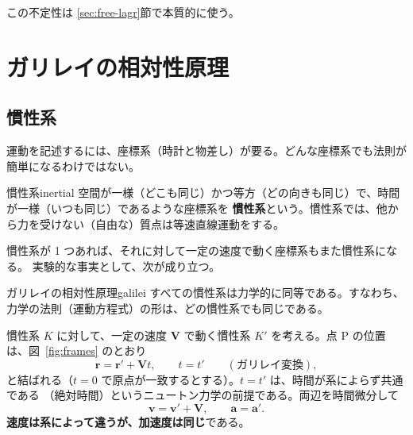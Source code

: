 この不定性は \ref{sec:free-lagr}節で本質的に使う。

\section{ガリレイの相対性原理}\label{sec:galilei}

\subsection{慣性系}

運動を記述するには、座標系（時計と物差し）が要る。どんな座標系でも法則が簡単になるわけではない。

\begin{defn}{慣性系}{inertial}
空間が一様（どこも同じ）かつ等方（どの向きも同じ）で、時間が一様（いつも同じ）であるような座標系を
\textbf{慣性系}という。慣性系では、他から力を受けない（自由な）質点は等速直線運動をする。
\end{defn}

慣性系が 1 つあれば、それに対して一定の速度で動く座標系もまた慣性系になる。
実験的な事実として、次が成り立つ。

\begin{principle}{ガリレイの相対性原理}{galilei}
すべての慣性系は力学的に同等である。すなわち、力学の法則（運動方程式）の形は、どの慣性系でも同じである。
\end{principle}

慣性系 $K$ に対して、一定の速度 $\bm V$ で動く慣性系 $K'$ を考える。点 P の位置は、図~\ref{fig:frames} のとおり
\begin{equation}
  \bm r=\bm r'+\bm V t,\qquad t=t' \qquad(\text{ガリレイ変換}),
  \label{eq:galilei}
\end{equation}
と結ばれる（$t=0$ で原点が一致するとする）。$t=t'$ は、時間が系によらず共通である
（絶対時間）というニュートン力学の前提である。両辺を時間微分して
\begin{equation}
  \bm v=\bm v'+\bm V,\qquad \bm a=\bm a'.
\end{equation}
\textbf{速度は系によって違うが、加速度は同じ}である。

